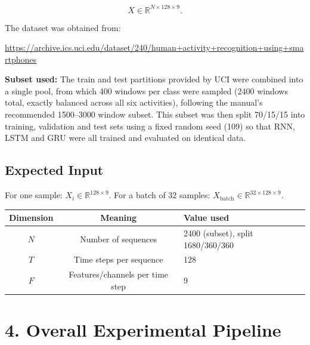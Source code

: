 \documentclass[10pt]{article}
\begin{document}
\[
X\in\mathbb{R}^{N\times128\times9}.
\]

The dataset was obtained from:

\url{https://archive.ics.uci.edu/dataset/240/human+activity+recognition+using+smartphones}

\textbf{Subset used:} The train and test partitions provided by UCI were
combined into a single pool, from which 400 windows per class were sampled
(2400 windows total, exactly balanced across all six activities), following
the manual's recommended 1500--3000 window subset. This subset was then
split 70/15/15 into training, validation and test sets using a fixed random
seed (109) so that RNN, LSTM and GRU were all trained and evaluated on
identical data.

\subsection*{Expected Input}

For one sample: $X_i\in\mathbb{R}^{128\times9}$. For a batch of 32 samples:
$X_{\mathrm{batch}}\in\mathbb{R}^{32\times128\times9}$.

\begin{center}
\begin{tabular}{|c|c|l|}
\hline
Dimension & Meaning & Value used\\
\hline
$N$ & Number of sequences & 2400 (subset), split 1680/360/360\\
$T$ & Time steps per sequence & 128\\
$F$ & Features/channels per time step & 9\\
\hline
\end{tabular}
\end{center}

\section*{4. Overall Experimental Pipeline}

\begin{center}
\end{center}
\end{document}
